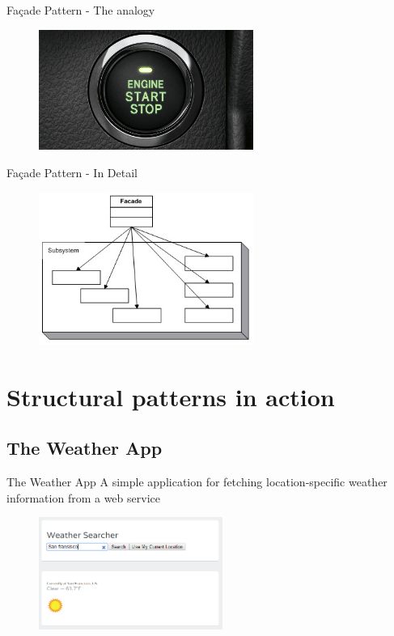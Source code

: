 \documentclass{beamer}
\begin{document}
\begin{frame}{Fa\c{c}ade Pattern - The analogy}
    \begin{figure}[htp]
    \centering
    \includegraphics[width=7cm]{pics/facade2}
    \label{fig:facade}
    \end{figure}
\end{frame}


\begin{frame}{Fa\c{c}ade Pattern - In Detail}
    \begin{figure}[htp]
    \centering
    \includegraphics[width=7cm]{pics/facade}
    \label{fig:facade2}
    \end{figure}
\end{frame}

\section{Structural patterns in action}
\subsection{The Weather App}

 \begin{frame}{The Weather App}
A simple application for fetching location-specific weather information from a web service
    \begin{figure}[htp]
    \centering
    \includegraphics[width=6cm]{pics/weathersearcher2}
    \label{fig:weather1}
    \end{figure}
\end{frame}
\end{document}
